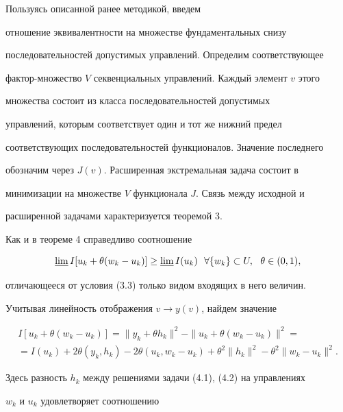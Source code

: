 \begin{pf} 


Пользуясь описанной ранее методикой, введем 


отношение эквивалентности на множестве фундаментальных снизу 


последовательностей допустимых управлений. Определим соответствующее 


фактор-множество $V$ секвенциальных управлений. Каждый элемент $v$ этого 


множества состоит из класса последовательностей допустимых 


управлений, которым соответствует один и тот же нижний предел 


соответствующих последовательностей функционалов. Значение последнего 


обозначим через $J(v)$. Расширенная экстремальная задача состоит в 


минимизации на множестве $V$ функционала $J$. Связь между исходной и 


расширенной задачами характеризуется теоремой 3. 


 


Как и в теореме 4 справедливо соотношение 


$$ 


\varliminf I[u_k+\theta(w_k-u_k)]\ge\varliminf I(u_k) 


\ \ \forall\{w_k\}\subset U,\ \ \theta\in(0,1), 


$$ 


отличающееся от условия (3.3) только видом входящих в него величин. 


Учитывая линейность отображения $v\to y(v)$, найдем значение 


\begin{multline} 


I[u_k+\theta(w_k-u_k)]=\|y_k+\theta h_k\|^2- 


\|u_k+\theta(w_k-u_k)\|^2= \\ 


% 


=I(u_k)+2\theta(y_k,h_k)-2\theta(u_k,w_k-u_k)+ 


\theta^2\|h_k\|^2-\theta^2\|w_k-u_k\|^2. 


\end{multline} 


Здесь разность $h_k$ между решениями задачи (4.1), (4.2) на управлениях 


$w_k$ и $u_k$ удовлетворяет соотношению 



\end{pf}
